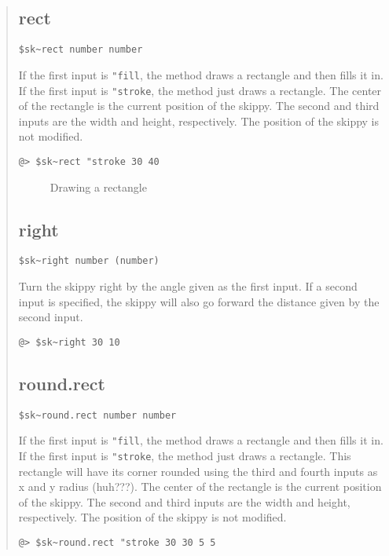 \documentclass[twoside,10pt,openany]{report}
\newcounter{ex}[chapter]
\newcounter{sc}[chapter]
\newcommand{\screen}[3]{
\begin{figure}[ht!]
\centering
\psfig{figure=images/eps/#2} 
\label{#1}
\caption{#3}
\end{figure}
}
\begin{document}
\begin{quote}
\subsection*{rect} 
\begin{verbatim}
$sk~rect number number
\end{verbatim}
If the first input is {\tt "fill}, the method draws a rectangle and then fills it in. If the first input is {\tt "stroke}, the method just draws a rectangle.  The center of the rectangle is the current position of the skippy.  The second and third inputs are the width and height, respectively. The position of the skippy is not modified.
\begin{verbatim}
@> $sk~rect "stroke 30 40
\end{verbatim}

\screen{s5}{sk5.eps}{Drawing a rectangle}

\subsection*{right} 
\begin{verbatim}
$sk~right number (number)
\end{verbatim}
Turn the skippy right by the angle given as the first input. If a second input is specified, the skippy will also go forward the distance given by the second input.
\begin{verbatim}
@> $sk~right 30 10
\end{verbatim}

\subsection*{round.rect} 
\begin{verbatim}
$sk~round.rect number number
\end{verbatim}
If the first input is {\tt "fill}, the method draws a rectangle and then fills it in. If the first input is {\tt "stroke}, the method just draws a rectangle. This rectangle will have its corner rounded using the third and fourth inputs as x and y radius (huh???). The center of the rectangle is the current position of the skippy.  The second and third inputs are the width and height, respectively. The position of the skippy is not modified.
\begin{verbatim}
@> $sk~round.rect "stroke 30 30 5 5
\end{verbatim}


\end{quote}
\end{document}
